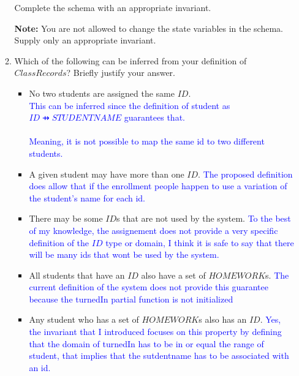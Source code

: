 \documentclass{article}
\begin{document}
\begin{enumerate}
\begin{enumerate}
Complete the schema with an appropriate invariant.

\textbf{Note:} You are not allowed to change the state variables
in the schema. Supply only an appropriate invariant.


\item Which of the following can be inferred from your definition
of $ClassRecords$? Briefly justify your answer.

\begin{itemize}
\item No two students are assigned the same $ID$.
  \\
  \textcolor{blue}{This can be inferred since the definition of student as $ID \pfun STUDENTNAME$ guarantees that.\\
\\    
    Meaning, it is not possible to map the same id to two different students.
  }

\item A given student may have more than one $ID$.
  \textcolor{blue}{The proposed definition does allow that if the enrollment people happen to use a variation of the student's name for each id.}

\item There may be some $ID$s that are not used by the system.
  \textcolor{blue}{To the best of my knowledge, the assignement does not provide a very specific definition of the $ID$ type or domain, I think it is safe to say that there will be many ids that wont be used by the system.}

\item All students that have an $ID$ also have a set of
  $HOMEWORK$s.
  \textcolor{blue}{The current definition of the system does not provide this guarantee because the turnedIn partial function is not initialized}

\item Any student who has a set of $HOMEWORK$s also has an $ID$.
 \textcolor{blue}{Yes, the invariant that I introduced focuses on this property by defining that the domain of turnedIn has to be in or equal the range of student, that implies that the sutdentname has to be associated with an id.}
\end{itemize}



\end{enumerate}
\end{enumerate}
\end{document}

